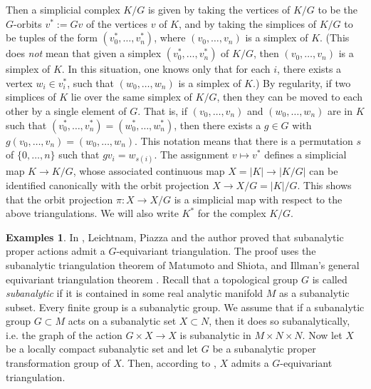 \documentclass{amsart}
\theoremstyle{definition}
\newtheorem{examples}[thm]{Examples}
\theoremstyle{remark}
\begin{document}
Then a simplicial complex $K/G$ is given by taking the vertices
of $K/G$ to be the $G$-orbits $v^* := Gv$ of the vertices $v$ of $K$,
and by taking the simplices of $K/G$ to be tuples of the form
$(v^*_0, \ldots, v^*_n)$, where $(v_0,\ldots, v_n)$ is a simplex of $K$.
(This does \emph{not} mean that given a simplex
$(v^*_0, \ldots, v^*_n)$ of $K/G$, then $(v_0,\ldots, v_n)$
is a simplex of $K$. In this situation, one knows only that for each $i$,
there exists a vertex $w_i \in v^*_i$, such that 
$(w_0,\ldots, w_n)$ is a simplex of $K$.)
By regularity, if two simplices of $K$ lie over the same simplex of
$K/G$, then they can be moved to each other by a single element of $G$.
That is, if $(v_0,\ldots, v_n)$ and $(w_0, \ldots, w_n)$ are in $K$ such that
$(v^*_0,\ldots, v^*_n) = (w^*_0, \ldots, w^*_n)$,
then there exists a $g\in G$ with
$g (v_0,\ldots, v_n) = (w_0, \ldots, w_n)$.
This notation means that there is a permutation $s$ of $\{ 0,\ldots, n \}$
such that $g v_i = w_{s(i)}$.
The assignment $v \mapsto v^*$ defines a simplicial map $K\to K/G$,
whose associated continuous map
$X=|K| \to |K/G|$ can be identified canonically with the orbit projection
$X \to X/G = |K|/G$.
This shows that the orbit projection $\pi: X\to X/G$ is a simplicial
map with respect to the above triangulations. We will also write $K^*$
for the complex $K/G$. \\

\begin{examples} \label{exples.subanalyticsimplicial}
In \cite[Prop. 6.7]{blp}, Leichtnam, Piazza and the author proved that
subanalytic proper actions admit
a $G$-equivariant triangulation.
The proof uses the subanalytic triangulation theorem 
\cite[Cor. 3.5]{matumotoshiota} of Matumoto and Shiota, 
and Illman's general equivariant triangulation theorem
\cite[p. 497, Thm. 5.5]{illmangenequivtriang}.
Recall that a topological group $G$ is called \emph{subanalytic}
if it is contained in some real analytic manifold $M$ as a subanalytic
subset.
Every finite group is a subanalytic group. 
We assume that if a subanalytic group $G \subset M$ acts
on a subanalytic set $X \subset N$, then it does so subanalytically,
i.e. the graph of the action $G \times X \to X$ is subanalytic in
$M\times N \times N$.
Now let $X$ be a locally compact subanalytic set and let $G$ be a
subanalytic proper transformation group of $X$.
Then, according to \cite[Prop. 6.7]{blp},
$X$ admits a $G$-equivariant triangulation.
\end{examples}
\end{document}
